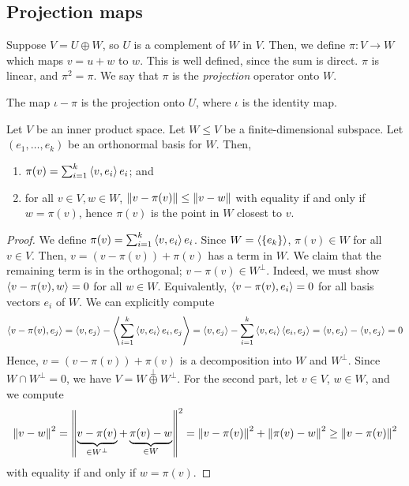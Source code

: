 \subsection{Projection maps}
\begin{definition}
	Suppose \( V = U \oplus W \), so \( U \) is a complement of \( W \) in \( V \).
	Then, we define \( \pi \colon V \to W \) which maps \( v = u + w \) to \( w \).
	This is well defined, since the sum is direct.
	\( \pi \) is linear, and \( \pi^2 = \pi \).
	We say that \( \pi \) is the \textit{projection} operator onto \( W \).
\end{definition}
\begin{remark}
	The map \( \iota - \pi \) is the projection onto \( U \), where \( \iota \) is the identity map.
\end{remark}
\begin{lemma}
	Let \( V \) be an inner product space.
	Let \( W \leq V \) be a finite-dimensional subspace.
	Let \( (e_1, \dots, e_k) \) be an orthonormal basis for \( W \).
	Then,
	\begin{enumerate}
		\item \( \pi(v) = \sum_{i=1}^k \left\langle{v, e_i}\right\rangle e_i \); and
		\item for all \( v \in V, w \in W \), \( \norm{v - \pi(v)} \leq \norm{v - w} \) with equality if and only if \( w = \pi(v) \), hence \( \pi(v) \) is the point in \( W \) closest to \( v \).
	\end{enumerate}
\end{lemma}
\begin{proof}
	We define \( \pi(v) = \sum_{i=1}^k \left\langle{v, e_i}\right\rangle e_i \).
	Since \( W = \left\langle{} \qty{e_k} \right\rangle \), \( \pi(v) \in W \) for all \( v \in V \).
	Then, \( v = (v - \pi(v)) + \pi(v) \) has a term in \( W \).
	We claim that the remaining term is in the orthogonal; \( v - \pi(v) \in W^\perp \).
	Indeed, we must show \( \left\langle{v - \pi(v), w}\right\rangle = 0 \) for all \( w \in W \).
	Equivalently, \( \left\langle{v - \pi(v), e_i}\right\rangle = 0 \) for all basis vectors \( e_i \) of \( W \).
	We can explicitly compute
	\[
		\left\langle{v - \pi(v), e_j}\right\rangle = \left\langle{v, e_j}\right\rangle - \left\langle{\sum_{i=1}^k \left\langle{v, e_i}\right\rangle e_i, e_j}\right\rangle = \left\langle{v, e_j}\right\rangle - \sum_{i=1}^k \left\langle{v, e_i}\right\rangle \left\langle{e_i, e_j}\right\rangle = \left\langle{v, e_j}\right\rangle - \left\langle{v, e_j}\right\rangle = 0
	\]
	Hence, \( v = (v - \pi(v)) + \pi(v) \) is a decomposition into \( W \) and \( W^\perp \).
	Since \( W \cap W^\perp = \qty{0} \), we have \( V = W \overset{\perp}{\oplus} W^\perp \).
	For the second part, let \( v \in V \), \( w \in W \), and we compute
	\[
		\norm{v - w}^2 = \norm{\underbrace{v - \pi(v)}_{\in W^\perp} + \underbrace{\pi(v) - w}_{\in W}}^2 = \norm{v - \pi(v)}^2 + \norm{\pi(v) - w}^2 \geq \norm{v - \pi(v)}^2
	\]
	with equality if and only if \( w = \pi(v) \).
\end{proof}

